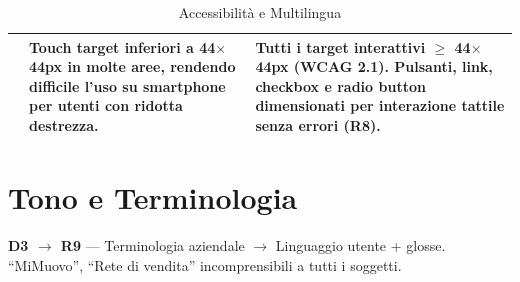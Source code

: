 \begin{table}[H]
\begin{tabular}{|p{0.5cm}|p{7cm}|p{7cm}|}
\raisebox{0.5cm}{\rotatebox{90}{\textbf{Target}}} &
Touch target inferiori a 44$\times$44px in molte aree, rendendo difficile l'uso su smartphone per utenti con ridotta destrezza. &
\textbf{Tutti i target interattivi $\ge$ 44$\times$44px} (WCAG 2.1). Pulsanti, link, checkbox e radio button dimensionati per interazione tattile senza errori (R8). \\ \hline
\end{tabular}
\caption{Accessibilità e Multilingua}
\label{tab:comparison-a11y}
\end{table}

\vspace{0.3cm}

\section{Tono e Terminologia}
\label{sec:comparison-tone}

\textbf{D3 $\rightarrow$ R9} --- Terminologia aziendale $\rightarrow$ Linguaggio utente + glosse. ``MiMuovo'', ``Rete di vendita'' incomprensibili a tutti i soggetti.

